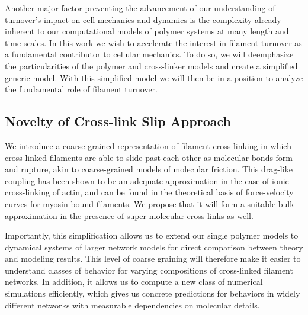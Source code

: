 Another major factor preventing the advancement of our understanding of turnover's impact on cell mechanics and dynamics is the complexity already inherent to our computational models of polymer systems at many length and time scales\cite{Mak2015}. In this work we wish to accelerate the interest in filament turnover as a fundamental contributor to cellular mechanics.  To do so, we will deemphasize the particularities of the polymer and cross-linker models and create a simplified generic model.  With this simplified model we will then be in a position to analyze the fundamental role of filament turnover.




\subsection{Novelty of Cross-link Slip Approach}

We introduce a coarse-grained representation of filament cross-linking in which cross-linked filaments are able to slide past each other as molecular bonds form and rupture, akin to coarse-grained models of molecular friction\cite{theo_friction,theo_frictionSam,theo_molefric}.  This drag-like coupling has been shown to be an adequate approximation in the case of ionic cross-linking of actin\cite{mol_fric,theo_hydroish2}, and can be found in the theoretical basis of force-velocity curves for myosin bound filaments\cite{theo_frictionShila}. We propose that it will form a suitable bulk approximation in the presence of super molecular cross-links as well.

Importantly, this simplification allows us to extend our single polymer models to dynamical systems of larger network models for direct comparison between theory and modeling results.  This level of coarse graining will therefore make it easier to understand classes of behavior for varying compositions of cross-linked filament networks.  In addition, it allows us to compute a new class of numerical simulations efficiently, which gives us concrete predictions for behaviors in widely different networks with measurable dependencies on molecular details.

